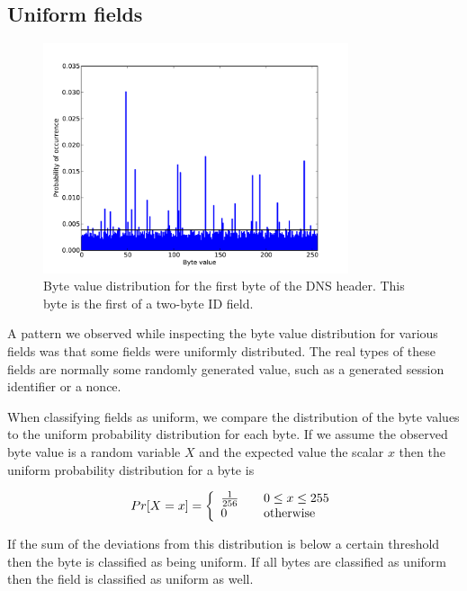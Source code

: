 \documentclass[a4paper]{report}
\begin{document}
\newpage

\subsection{Uniform fields}
\begin{figure}[h]
    \centering
    \includegraphics[width=0.8\textwidth]{img/uniform}
    \captionsetup{width=0.8\textwidth}
    \caption{Byte value distribution for the first byte of the DNS header.
        This byte is the first of a two-byte ID field.}
    \label{fig:uniform}
\end{figure}

A pattern we observed while inspecting the byte value distribution for
various fields was that some fields were uniformly distributed. The real
types of these fields are normally some randomly generated value, such as
a generated session identifier or a nonce.

When classifying fields as uniform, we compare the distribution of the byte
values to the uniform probability distribution for each byte. If we assume the
observed byte value is a random variable $X$ and the expected value the scalar
$x$ then the uniform probability distribution for a byte is

\[
    Pr[X = x] = \left\{
        \begin{array}{l l}
            \frac{1}{256} & \quad 0 \le x \le 255 \\
            0 & \quad \text{otherwise}
        \end{array}
    \right.
\]

If the sum of the deviations from this distribution is below a certain
threshold then the byte is classified as being uniform. If all bytes are
classified as uniform then the field is classified as uniform as well.
\end{document}
